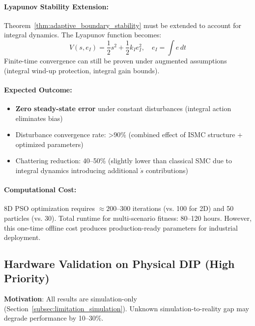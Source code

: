 \paragraph{Lyapunov Stability Extension:}
Theorem~\ref{thm:adaptive_boundary_stability} must be extended to account for integral dynamics. The Lyapunov function becomes:
\begin{equation}
    V(s, e_I) = \frac{1}{2}s^2 + \frac{1}{2}k_I e_I^2, \quad e_I = \int e \, dt
    \label{eq:conclusions_ismc_lyapunov}
\end{equation}
Finite-time convergence can still be proven under augmented assumptions (integral wind-up protection, integral gain bounds).

\paragraph{Expected Outcome:}
\begin{itemize}
    \item \textbf{Zero steady-state error} under constant disturbances (integral action eliminates bias)
    \item Disturbance convergence rate: >90\% (combined effect of ISMC structure + optimized parameters)
    \item Chattering reduction: 40--50\% (slightly lower than classical SMC due to integral dynamics introducing additional $\dot{s}$ contributions)
\end{itemize}

\paragraph{Computational Cost:}
8D PSO optimization requires $\approx 200$--300 iterations (vs. 100 for 2D) and 50 particles (vs. 30). Total runtime for multi-scenario fitness: 80--120 hours. However, this one-time offline cost produces production-ready parameters for industrial deployment.

\subsection{Hardware Validation on Physical DIP (High Priority)}
\label{sec:conclusions_hardware}

\textbf{Motivation}: All results are simulation-only (Section~\ref{subsec:limitation_simulation}). Unknown simulation-to-reality gap may degrade performance by 10--30\%.

